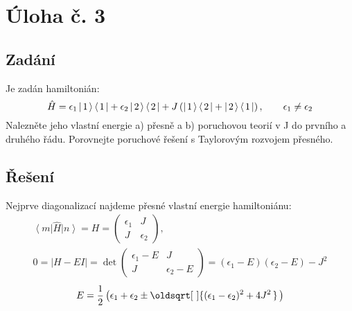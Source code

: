 \documentclass[10pt,a4paper]{article}
\renewcommand*{\sqrt}[2][\ ]{\oldsqrt[#1]{#2\,}\,}
\newcommand*{\mask}[2]{%
    \mathord{\makebox[\widthof{\(#1\)}]{\(#2\)}}%
}
\newcommand{\mat}[1]{
    \begin{pmatrix}
        #1
    \end{pmatrix}
}
\newcommand{\bra}[1]{\left< #1 \right|}
\newcommand{\ket}[1]{\left| #1 \right>}
\def\kone{\ket{\mask{+}{1}}}
\def\ktwo{\ket{\mask{+}{2}}}
\def\bone{\bra{\mask{+}{1}}}
\def\btwo{\bra{\mask{+}{2}}}
\begin{document}
\section{Úloha č. 3}
\subsection{Zadání}
Je zadán hamiltonián:
\begin{equation*}
    \hat{H} = \epsilon_1 \kone\bone + \epsilon_2 \ktwo\btwo + J \left( \kone\btwo + \ktwo\bone \right),
    \hspace{2em}
    \epsilon_1 \neq \epsilon_2
\end{equation*}
Nalezněte jeho vlastní energie a) přesně a b) poruchovou teorií v J do prvního a druhého řádu. Porovnejte poruchové řešení s Taylorovým rozvojem přesného.

\subsection{Řešení}
Nejprve diagonalizací najdeme přesné vlastní energie hamiltoniánu:
\begin{gather*}
    \bra{m} \hat{H} \ket{n} = H
    = \mat{ \epsilon_1 & J \\ J & \epsilon_2 },
    \\[5pt]
    0 = |H - E I|
    = \det \mat{ \epsilon_1-E & J \\ J & \epsilon_2-E }
    = (\epsilon_1-E)(\epsilon_2-E) - J^2
\end{gather*}
\begin{equation*}
    E = \frac{1}{2} \left(
        \epsilon_1 + \epsilon_2
        \pm \sqrt{(\epsilon_1 - \epsilon_2)^2 + 4J^2}
    \right)
\end{equation*}

\bigskip
\end{document}
